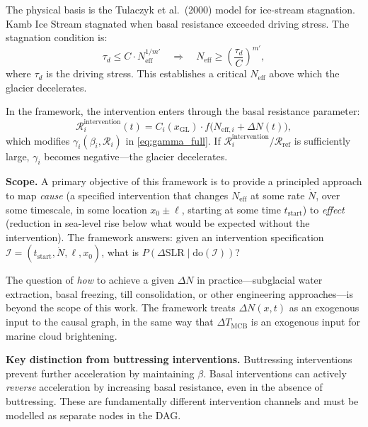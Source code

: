 \documentclass[11pt]{article}
\theoremstyle{definition}
\begin{document}
The physical basis is the Tulaczyk et al.\ (2000) model for ice-stream stagnation.  Kamb Ice Stream stagnated when basal resistance exceeded driving stress.  The stagnation condition is:
\begin{equation}
  \tau_d \leq C \cdot N_{\text{eff}}^{1/m'} \quad \Longrightarrow \quad N_{\text{eff}} \geq \left(\frac{\tau_d}{C}\right)^{m'},
  \label{eq:stagnation_condition}
\end{equation}
where $\tau_d$ is the driving stress.  This establishes a critical $N_{\text{eff}}$ above which the glacier decelerates.

In the framework, the intervention enters through the basal resistance parameter:
\begin{equation}
  \mathcal{R}_i^{\text{intervention}}(t) = C_i(x_\text{GL}) \cdot f\!\bigl(N_{\text{eff},i} + \Delta N(t)\bigr),
\end{equation}
which modifies $\gamma_i(\beta_i, \mathcal{R}_i)$ in \cref{eq:gamma_full}.  If $\mathcal{R}_i^{\text{intervention}} / \mathcal{R}_{\text{ref}}$ is sufficiently large, $\gamma_i$ becomes negative---the glacier decelerates.

\textbf{Scope.}  A primary objective of this framework is to provide a principled approach to map \emph{cause} (a specified intervention that changes $N_{\text{eff}}$ at some rate $\dot{N}$, over some timescale, in some location $x_0 \pm \ell$, starting at some time $t_{\text{start}}$) to \emph{effect} (reduction in sea-level rise below what would be expected without the intervention).  The framework answers: given an intervention specification $\mathcal{I} = (t_{\text{start}}, \dot{N}, \ell, x_0)$, what is $P(\Delta \text{SLR} \mid \text{do}(\mathcal{I}))$?

The question of \emph{how} to achieve a given $\Delta N$ in practice---subglacial water extraction, basal freezing, till consolidation, or other engineering approaches---is beyond the scope of this work.  The framework treats $\Delta N(x, t)$ as an exogenous input to the causal graph, in the same way that $\Delta T_{\text{MCB}}$ is an exogenous input for marine cloud brightening.

\textbf{Key distinction from buttressing interventions.}  Buttressing interventions prevent further acceleration by maintaining $\beta$.  Basal interventions can actively \emph{reverse} acceleration by increasing basal resistance, even in the absence of buttressing.  These are fundamentally different intervention channels and must be modelled as separate nodes in the DAG.
\end{document}
